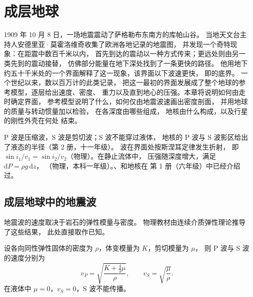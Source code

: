 \chapter{成层地球}\label{ch:b1:layered-earth}

1909 年 10 月 8 日，一场地震震动了萨格勒布东南方的库帕山谷。
当地天文台主持人安德里亚·莫霍洛维奇收集了欧洲各地记录的地震图，
并发现一个奇特现象：在距震中数百千米以内，
首先到达的震动以一种方式传来；更远处则由另一类先到的震动接替，
仿佛部分能量在地下深处找到了一条更快的路径。
他用地下约五十千米处的一个界面解释了这一现象，该界面以下波速更快，
即的底界。
一个世纪以来，数以百万计的此类记录，
把这一最初的界面发展成了整个地球的参考模型，逐层给出速度、密度、
重力以及直到地心的压强。本章将说明如何由走时确定界面，
参考模型说明了什么，如何仅由地震波速画出密度剖面，
并用地球的质量与转动惯量加以检验，
在各深度由哪些组成，
地核由什么构成，以及行星的刚性外壳在何处
结束。

\begin{recall}
P 波是压缩波，S 波是剪切波；S 波不能穿过液体，
地核的 P 波与 S 波影区给出了液态的半径（第 2 册，十一年级）。
波在界面处按斯涅耳定律发生折射，
即 $\sin i_1/v_1 = \sin i_2/v_2$（物理）。在静止流体中，
压强随深度增大，满足 $\mathrm dP = \rho g\,\mathrm dz$，
（物理，本科一年级）。、和地核在
第 1 册（六年级）中已经介绍过。
\end{recall}

\section{成层地球中的地震波}

地震波的速度取决于岩石的弹性模量与密度。
物理教材由连续介质弹性理论推导了这些结果，
此处直接取作已知。

\begin{proposition}[地震波速]\label{prop:b1:layered-earth:speeds}
设各向同性弹性固体的密度为 $\rho$，体变模量为 $K$，剪切模量为 $\mu$，
则 P 波与 S 波的速度分别为
\[
  v_P = \sqrt{\frac{K + \tfrac43\mu}{\rho}}, \qquad v_S = \sqrt{\frac{\mu}{\rho}}.
\]
在液体中 $\mu = 0$，$v_S = 0$，S 波不能传播。
\end{proposition}
\admitted

